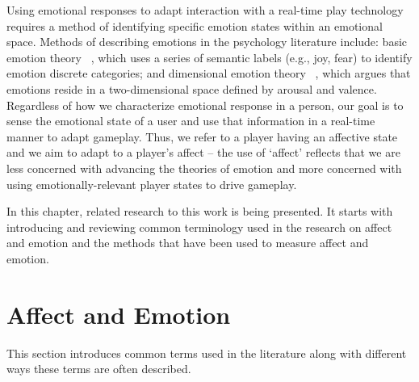 

Using emotional responses to adapt interaction with a real-time play technology requires a method of identifying specific emotion states within an emotional space. Methods of describing emotions in the psychology literature include: basic emotion theory ~\cite{ekman1992argument, ekman1992there}, which uses a series of semantic labels (e.g., joy, fear) to identify emotion discrete categories; and dimensional emotion theory ~\cite{lang1995emotion, russell1989affect}, which argues that emotions reside in a two-dimensional space defined by arousal and valence. Regardless of how we characterize emotional response in a person, our goal is to sense the emotional state of a user and use that information in a real-time manner to adapt gameplay. Thus, we refer to a player having an affective state and we aim to adapt to a player's affect – the use of `affect' reflects that we are less concerned with advancing the theories of emotion and more concerned with using emotionally-relevant player states to drive gameplay.

In this chapter, related research to this work is being presented. It starts with introducing and reviewing common terminology used in the research on affect and emotion and the methods that have been used to measure affect and emotion.

\section{Affect and Emotion}

This section introduces common terms used in the literature along with different ways these terms are often described.

